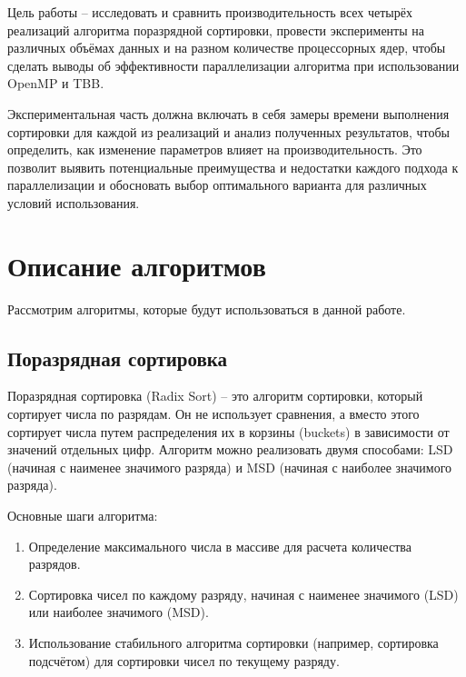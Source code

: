 \documentclass[]{article}
\theoremstyle{remark}
\theoremstyle{definition}
\begin{document}
\par Цель работы -- исследовать и сравнить производительность всех четырёх реализаций алгоритма поразрядной сортировки, провести эксперименты на различных объёмах данных и на разном количестве процессорных ядер, чтобы сделать выводы об эффективности параллелизации алгоритма при использовании OpenMP и TBB.

\par Экспериментальная часть должна включать в себя замеры времени выполнения сортировки для каждой из реализаций и анализ полученных результатов, чтобы определить, как изменение параметров влияет на производительность. Это позволит выявить потенциальные преимущества и недостатки каждого подхода к параллелизации и обосновать выбор оптимального варианта для различных условий использования.

\newpage

\section{Описание алгоритмов}

\par Рассмотрим алгоритмы, которые будут использоваться в данной работе.

\subsection{Поразрядная сортировка}

\par Поразрядная сортировка (Radix Sort) -- это алгоритм сортировки, который сортирует числа по разрядам. Он не использует сравнения, а вместо этого сортирует числа путем распределения их в корзины (buckets) в зависимости от значений отдельных цифр. Алгоритм можно реализовать двумя способами: LSD (начиная с наименее значимого разряда) и MSD (начиная с наиболее значимого разряда).

\par Основные шаги алгоритма:

\begin{enumerate}
    \item Определение максимального числа в массиве для расчета количества разрядов.
    \item Сортировка чисел по каждому разряду, начиная с наименее значимого (LSD) или наиболее значимого (MSD). 
    \item Использование стабильного алгоритма сортировки (например, сортировка подсчётом) для сортировки чисел по текущему разряду.
\end{enumerate}
\end{document}
